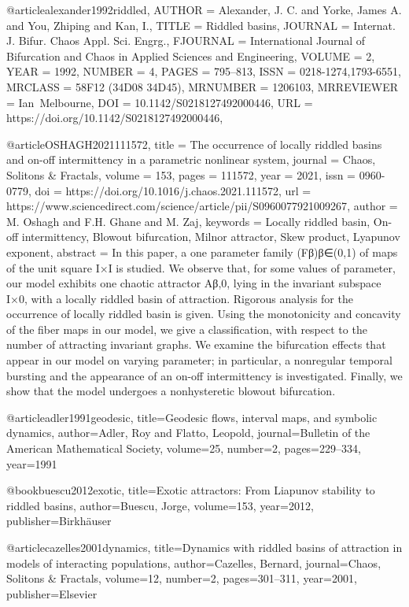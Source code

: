 @article{alexander1992riddled,
    AUTHOR = {Alexander, J. C. and Yorke, James A. and You, Zhiping and Kan,
              I.},
     TITLE = {Riddled basins},
   JOURNAL = {Internat. J. Bifur. Chaos Appl. Sci. Engrg.},
  FJOURNAL = {International Journal of Bifurcation and Chaos in Applied
              Sciences and Engineering},
    VOLUME = {2},
      YEAR = {1992},
    NUMBER = {4},
     PAGES = {795--813},
      ISSN = {0218-1274,1793-6551},
   MRCLASS = {58F12 (34D08 34D45)},
  MRNUMBER = {1206103},
MRREVIEWER = {Ian\ Melbourne},
       DOI = {10.1142/S0218127492000446},
       URL = {https://doi.org/10.1142/S0218127492000446},
}  


@article{OSHAGH2021111572,
title = {The occurrence of locally riddled basins and on-off intermittency in a parametric nonlinear system},
journal = {Chaos, Solitons & Fractals},
volume = {153},
pages = {111572},
year = {2021},
issn = {0960-0779},
doi = {https://doi.org/10.1016/j.chaos.2021.111572},
url = {https://www.sciencedirect.com/science/article/pii/S0960077921009267},
author = {M. Oshagh and F.H. Ghane and M. Zaj},
keywords = {Locally riddled basin, On-off intermittency, Blowout bifurcation, Milnor attractor, Skew product, Lyapunov exponent},
abstract = {In this paper, a one parameter family (Fβ)β∈(0,1) of maps of the unit square I×I is studied. We observe that, for some values of parameter, our model exhibits one chaotic attractor Aβ,0, lying in the invariant subspace I×{0}, with a locally riddled basin of attraction. Rigorous analysis for the occurrence of locally riddled basin is given. Using the monotonicity and concavity of the fiber maps in our model, we give a classification, with respect to the number of attracting invariant graphs. We examine the bifurcation effects that appear in our model on varying parameter; in particular, a nonregular temporal bursting and the appearance of an on-off intermittency is investigated. Finally, we show that the model undergoes a nonhysteretic blowout bifurcation.}
} 


@article{adler1991geodesic,
  title={Geodesic flows, interval maps, and symbolic dynamics},
  author={Adler, Roy and Flatto, Leopold},
  journal={Bulletin of the American Mathematical Society},
  volume={25},
  number={2},
  pages={229--334},
  year={1991}
}


@book{buescu2012exotic,
  title={Exotic attractors: From Liapunov stability to riddled basins},
  author={Buescu, Jorge},
  volume={153},
  year={2012},
  publisher={Birkh{\"a}user}
}

@article{cazelles2001dynamics,
  title={Dynamics with riddled basins of attraction in models of interacting populations},
  author={Cazelles, Bernard},
  journal={Chaos, Solitons \& Fractals},
  volume={12},
  number={2},
  pages={301--311},
  year={2001},
  publisher={Elsevier}
}

